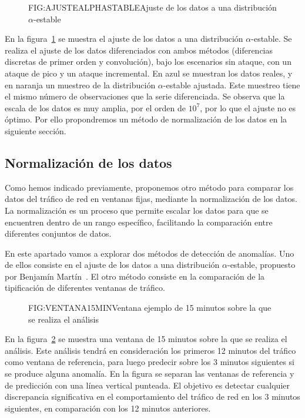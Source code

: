 \begin{figure}[Ajuste de los datos a una distribución $\alpha$-estable]{FIG:AJUSTEALPHASTABLE}{Ajuste de los datos a una distribución $\alpha$-estable}
    \label{FIG:AJUSTEALPHASTABLE}
\end{figure}

En la figura~\ref{FIG:AJUSTEALPHASTABLE} se muestra el ajuste de los datos a una distribución $\alpha$-estable. Se realiza el ajuste de los datos diferenciados con ambos métodos (diferencias discretas de primer orden y convolución), bajo los escenarios sin ataque, con un ataque de pico y un ataque incremental. En azul se muestran los datos reales, y en naranja un muestreo de la distribución $\alpha$-estable ajustada. Este muestreo tiene el mismo número de observaciones que la serie diferenciada.
Se observa que la escala de los datos es muy amplia, por el orden de $10^7$, por lo que el ajuste no es óptimo. Por ello propondremos un método de normalización de los datos en la siguiente sección.

\subsection{Normalizaci\'on de los datos}

Como hemos indicado previamente, proponemos otro método para comparar los datos del tráfico de red en ventanas fijas, mediante la normalización de los datos. La normalización es un proceso que permite escalar los datos para que se encuentren dentro de un rango específico, facilitando la comparación entre diferentes conjuntos de datos.

En este apartado vamos a explorar dos métodos de detección de anomalías. Uno de ellos consiste en el ajuste de los datos a una distribución $\alpha$-estable, propuesto por Benjamín Martín~\cite{benjamin2021}. El otro método consiste en la comparación de la tipificación de diferentes ventanas de tráfico.

\begin{figure}[Ventana ejemplo de 15 minutos sobre la que se realiza el análisis]{FIG:VENTANA15MIN}{Ventana ejemplo de 15 minutos sobre la que se realiza el análisis}
    \label{FIG:VENTANA15MIN}
\end{figure}

En la figura~\ref{FIG:VENTANA15MIN} se muestra una ventana de 15 minutos sobre la que se realiza el análisis. Este análisis tendrá en consideración los primeros 12 minutos del tráfico como ventana de referencia, para luego predecir sobre los 3 minutos siguientes si se produce alguna anomalía. En la figura se separan las ventanas de referencia y de predicción con una línea vertical punteada. El objetivo es detectar cualquier discrepancia significativa en el comportamiento del tráfico de red en los 3 minutos siguientes, en comparación con los 12 minutos anteriores.


